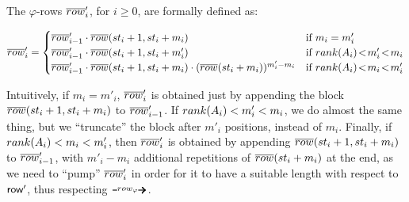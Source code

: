 The $\varphi$-rows $\overline{row}'_i$, for $i\geq 0$, are formally defined as:
\begin{small}
\[
\orow'_i =
\begin{cases} 
   \orow'_{i-1} \cdot \orow(st_i+1, st_i+m_i) 		& \text{if } m_i=m'_i \\
   \orow'_{i-1} \cdot \orow(st_i+1, st_i+m'_i)		& \text{if } \rank(A_i)\!<\! m'_i\!<\! m_i \\
   \orow'_{i-1} \cdot \orow(st_i+1, st_i+m_i) \cdot (\orow(st_i+m_i))^{m'_i-m_i}	& \text{if } \rank(A_i)\!<\! m_i\!<\! m'_i 
  \end{cases}
\]
\end{small}
Intuitively, if $m_i=m'_i$, $\overline{row}'_i$ is obtained just by appending the block $\overline{row}(st_i+1, st_i+m_i)$ to $\overline{row}'_{i-1}$. If $rank(A_i)<m'_i<m_i$, we do almost the same thing, but we ``truncate'' the block after $m'_i$ positions, instead of $m_i$. Finally, if $rank(A_i)<m_i<m'_i$, then $\overline{row}'_i$ is obtained by appending $\overline{row}(st_i+1, st_i+m_i)$ to $\overline{row}'_{i-1}$, with $m'_i-m_i$ additional repetitions of $\overline{row}(st_i+m_i)$ at the end, as we need to ``pump'' $\overline{row}'_i$ in order for it to have a suitable length with respect to $\text{{\sffamily row}}'$, thus respecting $\rownext$.


